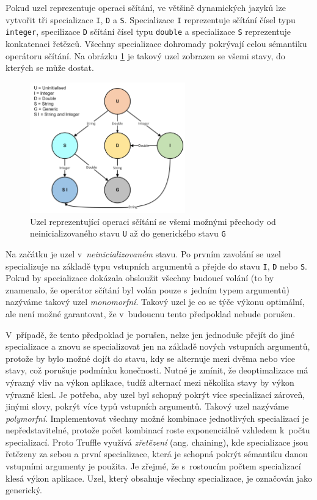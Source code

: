 \documentclass[
  master,
  biblatex,
  figures=true,
  theorems,
  sourcecodes,
  glossaries,
  index
]{kidiplom}
\begin{document}
Pokud uzel reprezentuje operaci sčítání, ve většině dynamických jazyků lze vytvořit tři specializace \texttt{I}, \texttt{D} a \texttt{S}. Specializace \texttt{I} reprezentuje sčítání čísel typu \texttt{integer}, specilizace \texttt{D} sčítání čísel typu \texttt{double} a specializace \texttt{S} reprezentuje konkatenaci řetězců. Všechny specializace dohromady pokrývají celou sémantiku operátoru sčítání. Na obrázku \ref{fig:node-transitions} je takový uzel zobrazen se všemi stavy, do kterých se může dostat.  

\begin{figure}
    \centering
    \includegraphics[width= 0.6\textwidth]{images/node-transitions.png}
    \caption{Uzel reprezentující operaci sčítání se všemi možnými přechody od neinicializovaného stavu \texttt{U} až do generického stavu \texttt{G}}
    \label{fig:node-transitions}
\end{figure}

Na začátku je uzel v~\textit{neinicializovaném} stavu. Po prvním zavolání se uzel specializuje na základě typu vstupních argumentů a přejde do stavu \texttt{I}, \texttt{D} nebo \texttt{S}. Pokud by specializace dokázala obsloužit všechny budoucí volání (to by znamenalo, že operátor sčítání byl volán pouze s~jedním typem argumentů) nazýváme takový uzel \textit{monomorfní}. Takový uzel je co se týče výkonu optimální, ale není možné garantovat, že v~budoucnu tento předpoklad nebude porušen.

V~případě, že tento předpoklad je porušen, nelze jen jednoduše přejít do jiné specializace a znovu se specializovat jen na základě nových vstupních argumentů, protože by bylo možné dojít do stavu, kdy se alternuje mezi dvěma nebo více stavy, což porušuje podmínku konečnosti. Nutné je zmínit, že deoptimalizace má výrazný vliv na výkon aplikace, tudíž alternací mezi několika stavy by výkon výrazně klesl. Je potřeba, aby uzel byl schopný pokrýt více specializací zároveň, jinými slovy, pokrýt více typů vstupních argumentů. Takový uzel nazýváme \textit{polymorfní}. Implementovat všechny možné kombinace jednotlivých specializací je nepředstavitelné, protože počet kombinací roste exponenciálně vzhledem k~počtu specializací. Proto Truffle využívá \textit{zřetězení} (ang. chaining), kde specializace jsou řetězeny za sebou a první specializace, která je schopná pokrýt sémantiku danou vstupními argumenty je použita. Je zřejmé, že s~rostoucím počtem specializací klesá výkon aplikace. Uzel, který obsahuje všechny specializace, je označován jako generický. 
\end{document}
